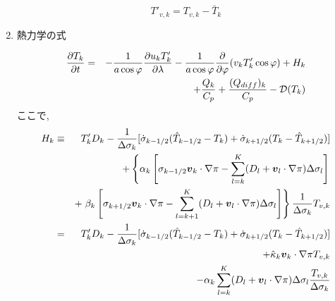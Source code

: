 \begin{enumerate}
\begin{equation}
T'_{v,k} = T_{v,k} - \bar{T}_k
\end{equation}

\item 熱力学の式

\begin{eqnarray}
  \frac{\partial T_k}{\partial t}
    & = & - \frac{1}{a\cos\varphi}
               \frac{\partial u_k T'_k}{\partial \lambda}
          - \frac{1}{a\cos\varphi}
               \frac{\partial }{\partial \varphi} (v_k T'_k \cos\varphi)
          + H_k \nonumber \\
    &   & + \frac{Q_k}{C_{p}}
          + \frac{(Q_{diff})_k}{C_p} 
          - {\cal D}(T_k) \nonumber \\
\end{eqnarray}
%
ここで,
\begin{eqnarray}
   H_k 
    & \equiv & T_k' D_k
              - \frac{1}{\Delta \sigma_k} 
             [   \dot{\sigma}_{k-1/2} ( \hat{T}_{k-1/2} - T_k   )
               + \dot{\sigma}_{k+1/2} ( T_k   - \hat{T}_{k+1/2} ) ]
               \nonumber \\
    &   & + \left\{ \alpha_k
                    \left[ \sigma_{k-1/2} \Dvect{v}_k \cdot \nabla \pi
                          - \sum_{l=k}^{K} 
                           ( D_l + \Dvect{v}_l \cdot \nabla \pi )
                            \Delta  \sigma_l
                    \right]
             \right.   \nonumber \\
    &   &   + \left. \beta_k
                     \left[ \sigma_{k+1/2} \Dvect{v}_k \cdot \nabla \pi
                          - \sum_{l=k+1}^{K} 
                           ( D_l + \Dvect{v}_l \cdot \nabla \pi )
                            \Delta  \sigma_l
                    \right]
              \right\} 
              \frac{1}{\Delta \sigma_k} T_{v,k}  \nonumber \\
%
    & = & T_k' D_k 
          - \frac{1}{\Delta \sigma_k} 
             [   \dot{\sigma}_{k-1/2} ( \hat{T}_{k-1/2} - T_k   )
               + \dot{\sigma}_{k+1/2} ( T_k   - \hat{T}_{k+1/2} ) ]
               \nonumber \\
    &   & + \hat{\kappa}_k \Dvect{v}_k \cdot \nabla \pi T_{v,k} 
               \nonumber \\
    &   & - \alpha_k \sum_{l=k}^{K} 
                           ( D_l + \Dvect{v}_l \cdot \nabla \pi )
                            \Delta  \sigma_l 
                            \frac{T_{v,k}}{\Delta \sigma_k} 
               \nonumber \\

\end{eqnarray}
\end{enumerate}
